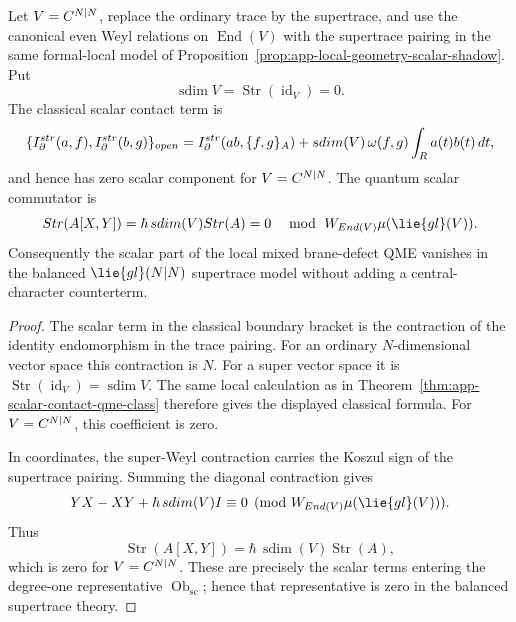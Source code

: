 \begin{thm}
\label{thm:app-balanced-supertrace-qme-cancellation}
  Let \(V=C^{N|N}\), replace the ordinary trace by the supertrace, and
  use the canonical even Weyl relations on \(\operatorname{End}(V)\)
  with the supertrace pairing in the same formal-local model of
  Proposition~\ref{prop:app-local-geometry-scalar-shadow}.  Put
  \[
    \operatorname{sdim}V=\operatorname{Str}(\operatorname{id}_V)=0 .
  \]
  The classical scalar contact term is
  \[
    \{I^{str}_\partial(a,f),
      I^{str}_\partial(b,g)\}_{open}
    =
    I^{str}_\partial(ab,\{f,g\}_{A})
    +sdim(V)\,
      \omega(f,g)\int_{R} a(t)b(t)\,dt,
  \]
  and hence has zero scalar component for \(V=C^{N|N}\).  The quantum
  scalar commutator is
  \[
    \operatorname{Str}(A[X,Y])
      =
    \hbar\,\operatorname{sdim}(V)\operatorname{Str}(A)
      =0
      \quad\bmod\ \mathcal W_{\operatorname{End}(V)}
             \widehat\mu(\lie{gl}(V)).
  \]
  Consequently the scalar part of the local mixed brane-defect QME
  vanishes in the balanced \(\lie{gl}(N|N)\) supertrace model without
  adding a central-character counterterm.
\end{thm}

\begin{proof}
  The scalar term in the classical boundary bracket is the contraction
  of the identity endomorphism in the trace pairing.  For an ordinary
  \(N\)-dimensional vector space this contraction is \(N\).  For a
  super vector space it is
  \(\operatorname{Str}(\operatorname{id}_V)=\operatorname{sdim}V\).
  The same local calculation as in
  Theorem~\ref{thm:app-scalar-contact-qme-class} therefore gives the
  displayed classical formula.  For \(V=C^{N|N}\), this coefficient is
  zero.

  In coordinates, the super-Weyl contraction carries the Koszul sign of
  the supertrace pairing.  Summing the diagonal contraction gives
  \[
    YX-XY+\hbar\,\operatorname{sdim}(V)I\equiv0
      \pmod{\mathcal W_{\operatorname{End}(V)}
             \widehat\mu(\lie{gl}(V))}.
  \]
  Thus
  \[
    \operatorname{Str}(A[X,Y])
      =\hbar\,\operatorname{sdim}(V)\operatorname{Str}(A),
  \]
  which is zero for \(V=C^{N|N}\).  These are precisely the scalar
  terms entering the degree-one representative
  \(\operatorname{Ob}_{\mathrm{sc}}\); hence that representative is
  zero in the balanced supertrace theory.
\end{proof}

